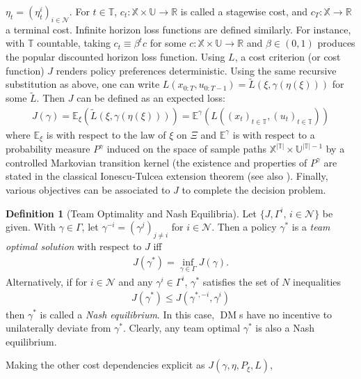 \documentclass[12pt, oneside]{report}
\newcommand{\E}{\mathbb{E}}
\newcommand{\mbb}[1]{\mathbb{#1}}
\newcommand{\1}[1]{\mathbbm{1}_{\{#1\}}}
\newcommand{\mc}[1]{\mathcal{#1}}
\DeclareMathOperator{\DM}{DM} \DeclareMathOperator{\argmin}{argmin}
\theoremstyle{definition}
\newtheorem{definition}[theorem]{Definition}
\begin{document}
$\eta_t=(\eta^i_t)_{i\in\mc{N}}$. For $t\in\mbb{T}$,
$c_t:\mbb{X}\times\mbb{U}\rightarrow\mbb{R}$ is called a stagewise cost, and
$c_T:\mbb{X}\rightarrow\mbb{R}$ a terminal cost. Infinite horizon loss functions
are defined similarly. For instance, with $\mbb{T}$ countable, taking
$c_t\equiv\beta^t c$ for some $c:\mbb{X}\times\mbb{U}\rightarrow\mbb{R}$ and
$\beta\in(0,1)$ produces the popular discounted horizon loss function. Using $L$, a cost
criterion (or cost function) $J$ renders policy preferences deterministic.
Using the same recursive substitution as above, one can
write $L(x_{0:T},u_{0:T-1})=\tilde{L}(\xi,\gamma(\eta(\xi)))$ for some
$\tilde{L}$. Then $J$ can be defined as an expected loss:
\begin{align}
    J(\gamma)=\E_\xi\left(\tilde{L}(\xi,\gamma(\eta(\xi)))\right)=\E^\gamma\left(L((x_t)_{t\in\mbb{T}},(u_t)_{t\in\mbb{T}})\right)
\end{align}
where $\E_\xi$ is with respect to the law of $\xi$ on $\Xi$ and
$\E^\gamma$ is with respect to a probability measure $P^\gamma$
induced on the space of sample paths
$\mbb{X}^{|\mbb{T}|}\times\mbb{U}^{|\mbb{T}|-1}$ by a controlled Markovian
transition kernel (the existence and properties of $P^\gamma$ are stated
in the classical Ionescu-Tulcea extension theorem \cite{Ionescu-Tulcea_1949} (see also
\cite[proposition 7.28]{Bertsekas_Shreve_2007}). Finally, various objectives can
be associated to $J$ to complete the decision problem.
\begin{definition}[Team Optimality and Nash Equilibria]\label{def2}
    Let $\{J,\Gamma^i,\,i\in\mc{N}\}$ be given. With $\gamma\in\Gamma$, let
    $\gamma^{-i}=(\gamma^j)_{j\neq i}$ for $i\in\mc{N}$. Then a policy
    $\gamma^\ast$ is a {\it team optimal solution} with respect to $J$ iff
    \begin{align*}
        J(\gamma^\ast)=\inf_{\gamma\in\Gamma}J(\gamma).
    \end{align*}
    Alternatively, if for $i\in\mc{N}$ and any $\gamma^i\in\Gamma^i$,
    $\gamma^\ast$ satisfies the set of $N$ inequalities
    \begin{align*}
        J(\gamma^\ast)\leq J(\gamma^{\ast,-i},\gamma^i)
    \end{align*}
    then $\gamma^\ast$ is called a {\it Nash equilibrium}. In this case, $\DM$s
    have no incentive to unilaterally deviate from $\gamma^\ast$. Clearly, any
    team optimal $\gamma^\ast$ is also a Nash equilibrium.
\end{definition}
\indent Making the other cost dependencies explicit as $J(\gamma,\eta,P_\xi, L)$,
\end{document}
